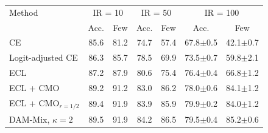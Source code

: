 \begin{tabular}{lcccccc}
\toprule
Method & \multicolumn{2}{c}{IR = 10} & \multicolumn{2}{c}{IR = 50} & \multicolumn{2}{c}{IR = 100} \\
 & Acc. & Few & Acc. & Few & Acc. & Few \\
\midrule
CE & 85.6 & 81.2 & 74.7 & 57.4 & 67.8{\scriptsize$\pm$0.5} & 42.1{\scriptsize$\pm$0.7} \\
Logit-adjusted CE & 86.3 & 85.7 & 78.5 & 69.9 & 73.5{\scriptsize$\pm$0.7} & 59.8{\scriptsize$\pm$2.1} \\
ECL & 87.2 & 87.9 & 80.6 & 75.4 & 76.4{\scriptsize$\pm$0.4} & 66.8{\scriptsize$\pm$1.2} \\
ECL + CMO & 89.2 & 91.2 & 83.0 & 86.2 & 78.0{\scriptsize$\pm$0.6} & 84.1{\scriptsize$\pm$1.2} \\
ECL + CMO$_{r=1/2}$ & 89.4 & 91.9 & 83.9 & 85.9 & 79.9{\scriptsize$\pm$0.2} & 84.0{\scriptsize$\pm$1.2} \\
DAM-Mix, $\kappa=2$ & 89.5 & 91.9 & 84.2 & 86.5 & 79.5{\scriptsize$\pm$0.4} & 85.2{\scriptsize$\pm$0.6} \\
\bottomrule
\end{tabular}
